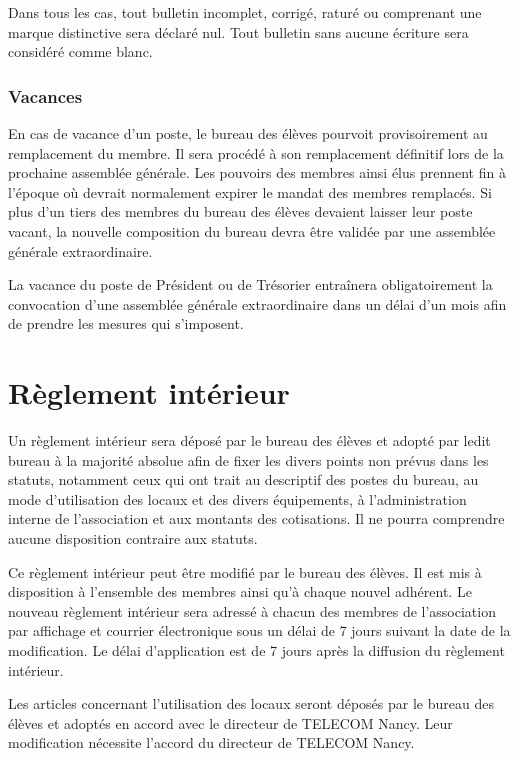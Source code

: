 \documentclass{article}
\begin{document}
				Dans tous les cas, tout bulletin incomplet, corrigé, raturé ou
				comprenant une marque distinctive sera déclaré nul. Tout
				bulletin sans aucune écriture sera considéré comme blanc.

			\subsubsection{Vacances}
				En cas de vacance d'un poste, le bureau des élèves pourvoit
				provisoirement au remplacement du membre. Il sera procédé à son
				remplacement définitif lors de la prochaine assemblée générale.
				Les pouvoirs des membres ainsi élus prennent fin à l’époque où
				devrait normalement expirer le mandat des membres remplacés. Si
				plus d’un tiers des membres du bureau des élèves devaient
				laisser leur poste vacant, la nouvelle composition du bureau
				devra être validée par une assemblée générale extraordinaire.

				La vacance du poste de Président ou de Trésorier entraînera
				obligatoirement la convocation d’une assemblée générale
				extraordinaire dans un délai d’un mois afin de prendre les
				mesures qui s’imposent.

	\section{Règlement intérieur}
		Un règlement intérieur sera déposé par le bureau des élèves et adopté
		par ledit bureau à la majorité absolue afin de fixer les divers points
		non prévus dans les statuts, notamment ceux qui ont trait au descriptif
		des postes du bureau, au mode d’utilisation des locaux et des divers
		équipements, à l’administration interne de l’association et aux montants
		des cotisations. Il ne pourra comprendre aucune disposition contraire
		aux statuts.

		Ce règlement intérieur peut être modifié par le bureau des élèves. Il
		est mis à disposition à l’ensemble des membres ainsi qu’à chaque nouvel
		adhérent. Le nouveau règlement intérieur sera adressé à chacun des
		membres de l'association par affichage et courrier électronique sous un
		délai de 7 jours suivant la date de la modification. Le délai
		d’application est de 7 jours après la diffusion du règlement intérieur.

		Les articles concernant l’utilisation des locaux seront déposés par le
		bureau des élèves et adoptés en accord avec le directeur de TELECOM
		Nancy. Leur modification nécessite l’accord du directeur de TELECOM
		Nancy.
\end{document}
